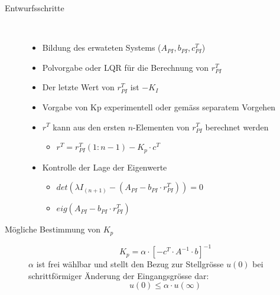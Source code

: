 \begin{description}
	\item[Entwurfsschritte]~\par
	\begin{itemize}
		\item Bildung des erwateten Systems ($ A_{PI}, b_{PI}, c^T_{PI} $)
		\item Polvorgabe oder LQR für die Berechnung von $ r^T_{PI} $ 
		\item Der letzte Wert von $r^T_{PI} $ ist $-K_I$
		\item Vorgabe von Kp experimentell oder gemäss separatem Vorgehen
		\item $r^T$ kann aus den ersten $n$-Elementen von $r^T_{PI} $ berechnet werden
		\begin{itemize}
			\item $ r^T=r^T_{PI}(1:n-1)-K_p\cdot c^T $
		\end{itemize}
		\item Kontrolle der Lage der Eigenwerte
		\begin{itemize}
			\item $det(\lambda I_{(n+1)}-(A_{PI}-b_{PI}\cdot r^T_{PI}))=0 $
			\item $eig(A_{PI}-b_{PI}\cdot r^T_{PI})	$
		\end{itemize} 	
	\end{itemize}
\end{description}

\begin{description}
	\item [Mögliche Bestimmung von $K_p$]
	\[
		K_p=\alpha \cdot [-c^T\cdot A^{-1}\cdot b]^{-1}
	\]
	$\alpha $ ist frei wählbar und stellt den Bezug zur Stellgrösse $ u(0) $ bei schrittförmiger Änderung der Eingangsgrösse dar: 
	\[ u(0)\leqslant \alpha\cdot u(\infty)
	\]
\end{description}